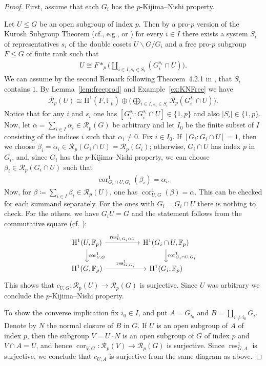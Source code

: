\documentclass{amsart}
\theoremstyle{definition}
\theoremstyle{remark}
\DeclareMathOperator{\res}{res}
\DeclareMathOperator{\cores}{cor}
\newcommand{\FF}{\mathbb{F}}
\newcommand{\calR}{\mathcal{R}}
\newcommand{\rmH}{\mathrm H}%
\begin{document}
\begin{proof}
    First, assume that each $G_i$ has the $p$-Kijima--Nishi property. 

    Let $U\leq G$ be an open subgroup of index $p$. Then by a pro-$p$ version of the Kurosh Subgroup Theorem (cf., e.g., \cite[Thm.~D.3.1]{RibesZalesskii2010} or \cite[Thm.~4.2.1]{NSW2008}) for every $i\in I$ there exists a system $S_i$ of representatives $s_i$ of the double cosets $U\backslash G/G_i$ and a free pro-$p$ subgroup $F\leq G$ of finite rank such that 
    \begin{align*}
        U\cong F\ast_p\Big(\coprod_{i\in I, s_i\in S_i}(G_i^{s_i}\cap U)\Big).
    \end{align*}
    We can assume by the second Remark following Theorem~4.2.1 in \cite{NSW2008}, that $S_i$ contains $1$. By Lemma~\ref{lem:freeprod} and Example~\ref{ex:KNFree} we have 
    \begin{align*}
        \calR_p(U)\cong \rmH^1(F,\FF_p)\oplus \Big(\bigoplus_{i\in I,s_i\in S_i}\calR_p(G_i^{s_i}\cap U)\Big).
    \end{align*}
    Notice that for any $i$ and $s_i$ one has $[G_i^{s_i}:G_i^{s_i}\cap U]\in \{1,p\}$ and also $|S_i|\in \{1,p\}$. Now, let $\alpha=\sum_{i\in I}\alpha_i\in \calR_p(G)$ be arbitrary and let $I_0$ be the finite subset of $I$ consisting of the indices $i$ such that $\alpha_i\neq 0$. Fix $i\in I_0$. If $[G_i:G_i\cap U]=1$, then we choose $\beta_i=\alpha_i\in \calR_p(G_i\cap U)=\calR_p(G_i)$; otherwise, $G_i\cap U$ has index $p$ in $G_i$, and, since $G_i$ has the $p$-Kijima--Nishi property, we can choose $\beta_i\in \calR_p(G_i\cap U)$ such that 
    \begin{align*}
        \cores^1_{G_i\cap U,G_i}(\beta_i)=\alpha_i.
    \end{align*}
    Now, for $\beta\coloneq \sum_{i\in I}\beta_{i}\in \calR_p(U)$, one has $\cores^1_{U,G}(\beta)=\alpha$. This can be checked for each summand separately. For the ones with $G_i=G_i\cap U$ there is nothing to check. For the others, we have $G_iU=G$ and the statement follows from the commutative square (cf. \cite[Cor. 1.5.8]{NSW2008}):
    \begin{equation*}
        \begin{tikzcd}[column sep=huge]
    \rmH^1(U,\FF_p)\arrow[r,"\res_{U,G_i\cap U}^1"]\arrow[d,"\cores_{U,G}^1"]&\rmH^1(G_i\cap U,\FF_p)\arrow[d,"\cores_{G_i\cap U,G_i}^1"]\\
     \rmH^1(G,\FF_p)\arrow[r,"\res_{G,G_i}^1"]&\rmH^1(G_i,\FF_p)
        \end{tikzcd}
    \end{equation*}
    This shows that $c_{U,G}:\calR_p(U)\to \calR_p(G)$ is surjective. Since $U$ was arbitrary we conclude the $p$-Kijima--Nishi property.

    To show the converse implication fix $i_0\in I$, and put $A=G_{i_0}$ and $B=\coprod_{i\neq i_0}G_i$. Denote by $N$ the normal closure of $B$ in $G$. 
    If $U$ is an open subgroup of $A$ of index $p$, then the subgroup $V=U\cdot N$ is an open subgroup of $G$ of index $p$ and $V\cap A=U$, and hence $\cores_{V,G}:\calR_p(V)\to \calR_p(G)$ is surjective. Since $\res^1_{G,A}$ is surjective, we conclude that $c_{U,A}$ is surjective from the same diagram as above.
\end{proof}
\end{document}
